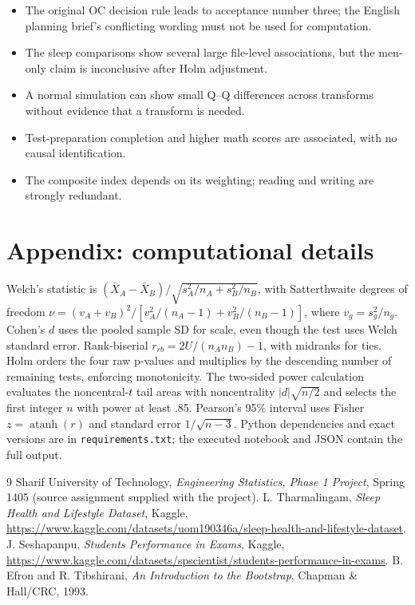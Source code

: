 \documentclass[11pt,a4paper]{article}
\begin{document}
\begin{itemize}
\item The original OC decision rule leads to acceptance number three; the English planning brief's conflicting wording must not be used for computation.
\item The sleep comparisons show several large file-level associations, but the men-only claim is inconclusive after Holm adjustment.
\item A normal simulation can show small Q--Q differences across transforms without evidence that a transform is needed.
\item Test-preparation completion and higher math scores are associated, with no causal identification.
\item The composite index depends on its weighting; reading and writing are strongly redundant.
\end{itemize}

\section{Appendix: computational details}
Welch's statistic is $(\bar X_A-\bar X_B)/\sqrt{s_A^2/n_A+s_B^2/n_B}$, with Satterthwaite degrees of freedom $\nu=(v_A+v_B)^2/[v_A^2/(n_A-1)+v_B^2/(n_B-1)]$, where $v_g=s_g^2/n_g$. Cohen's $d$ uses the pooled sample SD for scale, even though the test uses Welch standard error. Rank-biserial $r_{rb}=2U/(n_A n_B)-1$, with midranks for ties. Holm orders the four raw p-values and multiplies by the descending number of remaining tests, enforcing monotonicity. The two-sided power calculation evaluates the noncentral-$t$ tail areas with noncentrality $|d|\sqrt{n/2}$ and selects the first integer $n$ with power at least .85. Pearson's 95\% interval uses Fisher $z=\operatorname{atanh}(r)$ and standard error $1/\sqrt{n-3}$. Python dependencies and exact versions are in \texttt{requirements.txt}; the executed notebook and JSON contain the full output.

\begin{thebibliography}{9}
 Sharif University of Technology, \emph{Engineering Statistics, Phase 1 Project}, Spring 1405 (source assignment supplied with the project).
 L. Tharmalingam, \emph{Sleep Health and Lifestyle Dataset}, Kaggle, \url{https://www.kaggle.com/datasets/uom190346a/sleep-health-and-lifestyle-dataset}.
 J. Seshapanpu, \emph{Students Performance in Exams}, Kaggle, \url{https://www.kaggle.com/datasets/spscientist/students-performance-in-exams}.
 B. Efron and R. Tibshirani, \emph{An Introduction to the Bootstrap}, Chapman \& Hall/CRC, 1993.
\end{thebibliography}
\end{document}
